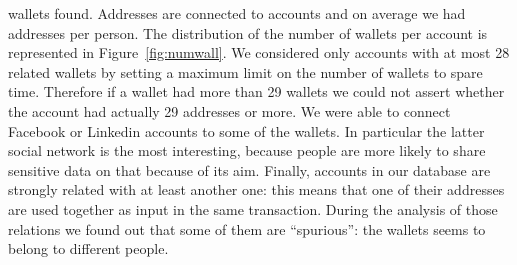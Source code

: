 wallets found.
Addresses are connected to \accountNumber{} accounts and on average we had
\avarageAccount{} addresses per person.
The distribution of the number of wallets per account is represented in
Figure~\ref{fig:numwall}. We considered only accounts with at most 28 related
wallets by setting a maximum limit on the number of
wallets to spare time.
Therefore if a wallet had more than 29 wallets we could not assert whether
the account had actually 29 addresses or more.
We were able to connect Facebook or Linkedin accounts to some of the wallets.
In particular the latter social network is the most interesting, because people
are more likely to share sensitive data on that because of its aim.
Finally, \accountRelated{} accounts in our database are strongly related with
at least another one: this means that one of their addresses are used together
as input in the same transaction. During the analysis of those relations we
found out that some of them are ``spurious'': the wallets seems to belong to
different people.
